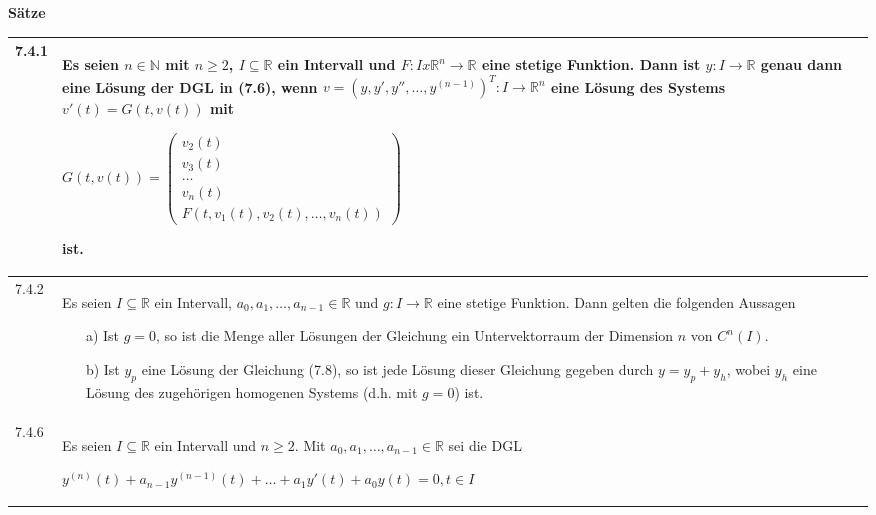     \noindent 
    \textbf{Sätze}
    \begin{table}[H]
    \begin{tabularx}{\textwidth}{X m{16cm}}
        \toprule

        7.4.1 & Es seien $n \in \mathbb{N}$ mit $n \geq 2$, $I \subseteq \mathbb{R}$ ein Intervall und $F: Ix \mathbb{R}^n \rightarrow \mathbb{R}$
                eine stetige Funktion. Dann ist $y: I \rightarrow \mathbb{R}$ genau dann eine Lösung der DGL in (7.6), wenn $v = (y,y',y''
                ,\dots, y^{(n-1)})^T:I \rightarrow \mathbb{R}^n$ eine Lösung des Systems $v'(t) = G(t,v(t))$ mit \hfill \break
                \centerline{$ G(t,v(t)) =   \begin{pmatrix}
                                            v_2(t) \\
                                            v_3(t) \\
                                            \dots \\
                                            v_n(t) \\
                                            F(t,v_1(t),v_2(t),\dots,v_n(t)) 
                                            \end{pmatrix}  $} 
                ist. \\
        \midrule
        7.4.2 & Es seien $I \subseteq \mathbb{R}$ ein Intervall, $a_0,a_1, \dots, a_{n-1} \in \mathbb{R}$ und $g: I \rightarrow \mathbb{R}$ eine
                stetige Funktion. Dann gelten die folgenden Aussagen
                \begin{itemize}[topsep=-0.5cm]
                    \item[a)] Ist $g=0$, so ist die Menge aller Lösungen der Gleichung ein Untervektorraum der Dimension $n$ von $C^n(I)$.
                    \item[b)] Ist $y_p$ eine Lösung der Gleichung (7.8), so ist jede Lösung dieser Gleichung gegeben durch $y = y_p + y_h$, wobei
                                $y_h$ eine Lösung des zugehörigen homogenen Systems (d.h. mit $g=0$) ist.   
                \end{itemize} \vspace{-0cm} \\
        \midrule
        7.4.6 & Es seien $I \subseteq \mathbb{R}$ ein Intervall und $n \geq 2$. Mit $a_0,a_1,\dots,a_{n-1} \in \mathbb{R}$ sei die DGL \hfill \break
                \centerline{$ y^{(n)}(t) + a_{n-1} y^{(n-1)} (t) + \dots + a_1 y'(t) +a_0y(t) = 0, t\in I$}

\end{tabularx}
\end{table}
